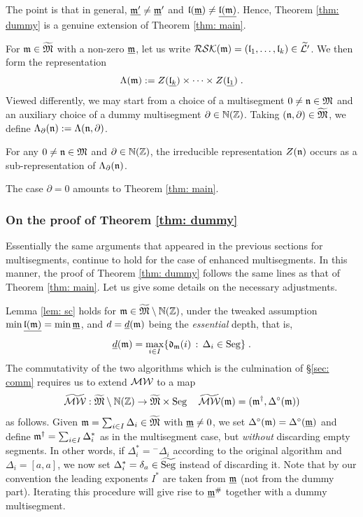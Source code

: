 \documentclass{ert-l} %
\begin{document}
The point is that in general, $\underline{\mathfrak{m}'}\ne\underline{\mathfrak{m}}'$ and $\mathfrak{l}(\underline{\mathfrak{m}})\ne\underline{\mathfrak{l}(\mathfrak{m})}$.
Hence, Theorem \ref{thm: dummy} is a genuine extension of  Theorem \ref{thm: main}.

For $\mathfrak{m}\in \widetilde{\mathfrak{M}}$ with a non-zero $\underline{\mathfrak{m}}$, let us write $\mathcal{RSK}(\mathfrak{m})=(\mathfrak{l}_1,\dots,\mathfrak{l}_k)\in\widetilde{\mathcal{L}'}$.
We then form the representation
\[
\Lambda(\mathfrak{m}):= Z(\underline{\mathfrak{l}_k}) \times \cdots \times Z(\underline{\mathfrak{l}_1})\;.
\]
Viewed differently, we may start from a choice of a multisegment $0\neq \mathfrak{n} \in \mathfrak{M}$ and an auxiliary choice of a dummy multisegment $\partial\in\mathbb{N}(\mathbb{Z})$.
Taking $(\mathfrak{n},\partial)\in \widetilde{\mathfrak{M}}$, we define $\Lambda_\partial(\mathfrak{n}):=\Lambda(\mathfrak{n},\partial)$.

\begin{corollary}\label{cor: dumm}
For any $0\neq \mathfrak{n}\in \mathfrak{M}$ and $\partial\in \mathbb{N}(\mathbb{Z})$, the irreducible representation $Z(\mathfrak{n})$ occurs as a sub-representation of $\Lambda_\partial(\mathfrak{n})$.
\end{corollary}
The case $\partial=0$ amounts to Theorem \ref{thm: main}.

\subsubsection{On the proof of Theorem \ref{thm: dummy}}

Essentially the same arguments that appeared in the previous sections for multisegments, continue to hold for the case of enhanced multisegments.
In this manner, the proof of Theorem \ref{thm: dummy} follows the same lines as that of Theorem \ref{thm: main}. Let us give some details on the necessary adjustments.

Lemma \ref{lem: sc} holds for $\mathfrak{m}\in \widetilde{\mathfrak{M}}\setminus\mathbb{N}(\mathbb{Z})$, under the tweaked assumption $\min \underline{\mathfrak{l}(\mathfrak{m})} = \min \underline{\mathfrak{m}}$,
and $d= \underline{d}(\mathfrak{m})$ being the \textit{essential} depth, that is,
\[
\underline{d}(\mathfrak{m}) = \max_{i\in I}\{ \mathfrak{d}_{\mathfrak{m}}(i)\,:\, \Delta_i\in \operatorname{Seg}\}\;.
\]
The commutativity of the two algorithms which is the culmination of \S\ref{sec: comm} requires us to extend $\mathcal{MW}$ to a map
\begin{equation} \label{eq: newMW}
\widetilde{\MW}:\widetilde{\Mult}\setminus\N(\Z) \to \widetilde{\Mult} \times \Seg\ \ \ \widetilde{\MW}(\m)=(\m^{\MWn},\Delta^{\nMW}(\m))
\end{equation}
as follows. Given $\mathfrak{m}=\sum_{i\in I} \Delta_i \in \widetilde{\mathfrak{M}}$ with $\underline{\mathfrak{m}}\neq 0$,
we set $\Delta^{\circ}(\mathfrak{m}) = \Delta^{\circ}(\underline{\mathfrak{m}})$ and define $\mathfrak{m}^{\dagger} = \sum_{i\in I} \Delta_i^*$ as in the multisegment case,
but \textit{without} discarding empty segments. In other words, if $\Delta_i^* = {}^-\Delta_i$ according to the original algorithm and
$\Delta_i = [a,a]$, we now set $\Delta_i^* = \delta_a \in \widetilde{\operatorname{Seg}}$ instead of discarding it.
Note that by our convention the leading exponents $I^*$ are taken from $\underline{\mathfrak{m}}$ (not from the dummy part).
Iterating this procedure will give rise to $\underline{\mathfrak{m}}^\#$ together with a dummy multisegment.
\end{document}
